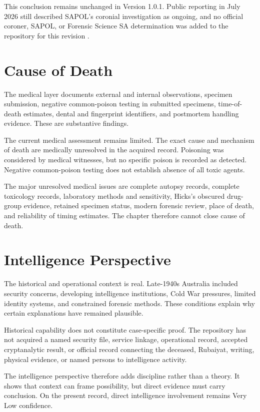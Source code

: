 This conclusion remains unchanged in Version 1.0.1. Public reporting in July 2026 still described SAPOL's coronial investigation as ongoing, and no official coroner, SAPOL, or Forensic Science SA determination was added to the repository for this revision \parencite{m11-m11-src-0001}.

\section{Cause of Death}

The medical layer documents external and internal observations, specimen submission, negative common-poison testing in submitted specimens, time-of-death estimates, dental and fingerprint identifiers, and postmortem handling evidence. These are substantive findings.

The current medical assessment remains limited. The exact cause and mechanism of death are medically unresolved in the acquired record. Poisoning was considered by medical witnesses, but no specific poison is recorded as detected. Negative common-poison testing does not establish absence of all toxic agents.

The major unresolved medical issues are complete autopsy records, complete toxicology records, laboratory methods and sensitivity, Hicks's obscured drug-group evidence, retained specimen status, modern forensic review, place of death, and reliability of timing estimates. The chapter therefore cannot close cause of death.

\section{Intelligence Perspective}

The historical and operational context is real. Late-1940s Australia included security concerns, developing intelligence institutions, Cold War pressures, limited identity systems, and constrained forensic methods. These conditions explain why certain explanations have remained plausible.

Historical capability does not constitute case-specific proof. The repository has not acquired a named security file, service linkage, operational record, accepted cryptanalytic result, or official record connecting the deceased, Rubaiyat, writing, physical evidence, or named persons to intelligence activity.

The intelligence perspective therefore adds discipline rather than a theory. It shows that context can frame possibility, but direct evidence must carry conclusion. On the present record, direct intelligence involvement remains Very Low confidence.

